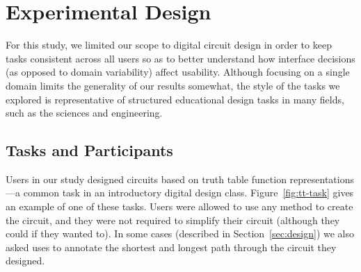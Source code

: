 \documentclass{egpubl}
\begin{document}
\section{Experimental Design}
For this study, we limited our scope to digital circuit design in order
to keep tasks consistent across all users so as to better
understand how interface decisions (as opposed to domain variability)
affect usability.  Although focusing on a single domain limits the
generality of our results somewhat, the style of the tasks we
explored is representative of structured educational design tasks 
in many fields, such as the sciences and engineering.

\subsection{Tasks and Participants}
Users in our study designed circuits based on truth table function
representations---a common task in an introductory digital design
class.  Figure~\ref{fig:tt-task} gives an example of one of these
tasks.  Users were allowed to use any method to
create the circuit, and they were not required to simplify their
circuit (although they could if they wanted to).  In some cases
(described in Section~\ref{sec:design}) we also asked uses to annotate the
shortest and longest path through the circuit they designed.
\end{document}
